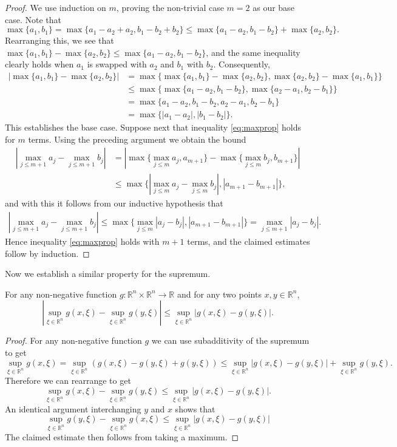 \documentclass[oneside,hidelinks,indentfirst,10pt]{book}
\begin{document}
\begin{proof}
We use induction on \(m\), proving the non-trivial case \(m=2\) as our base case. Note that
\[
    \max\{a_1,b_1\}=\max\{a_1-a_2+a_2,b_1-b_2+b_2\}\leq \max\{a_1-a_2,b_1-b_2\}+\max\{a_2,b_2\}.
\]
Rearranging this, we see that \(\max\{a_1,b_1\}-\max\{a_2,b_2\}\leq \max\{a_1-a_2,b_1-b_2\}\), and the same inequality clearly holds when \(a_1\) is swapped with \(a_2\) and \(b_1\) with \(b_2\). Consequently,
\begin{align*}
    |\max\{a_1,b_1\}-\max\{a_2,b_2\}|&=\max\{\max\{a_1,b_1\}-\max\{a_2,b_2\},\max\{a_2,b_2\}-\max\{a_1,b_1\}\}\\
    &\leq \max\{\max\{a_1-a_2,b_1-b_2\},\max\{a_2-a_1,b_2-b_1\}\}\\
    &=\max\{a_1-a_2,b_1-b_2,a_2-a_1,b_2-b_1\}\\
    &=\max\{|a_1-a_2|,|b_1-b_2|\}.
\end{align*}
This establishes the base case. Suppose next that inequality \eqref{eq:maxprop} holds for \(m\) terms. Using the preceding argument we obtain the bound
\begin{align*}
    |\max_{j\leq m+1}a_j-\max_{j\leq m+1}b_j|&=|\max\{\max_{j\leq m}a_j,a_{m+1}\}-\max\{\max_{j\leq m}b_j,b_{m+1}\}|\\
    &\leq \max\{|\max_{j\leq m}a_j-\max_{j\leq m}b_j|,|a_{m+1}-b_{m+1}|\},
\end{align*}
and with this it follows from our inductive hypothesis that
\begin{align*}
    |\max_{j\leq m+1}a_j-\max_{j\leq m+1}b_j|\leq \max\{ \max_{j\leq m}|a_j-b_j|,|a_{m+1}-b_{m+1}|\}= \max_{j\leq m+1}|a_j-b_j|  .  
\end{align*}
Hence inequality \eqref{eq:maxprop} holds with \(m+1\) terms, and the claimed estimates follow by induction.
\end{proof}


Now we establish a similar property for the supremum.


\begin{lem}\label{lem:supprop}
For any non-negative function \(g:\mathbb{R}^n\times\mathbb{R}^n\rightarrow\mathbb{R}\) and for any two points \(x,y\in\mathbb{R}^n\),
\[
    |\sup_{\xi\in\mathbb{R}^n} g(x,\xi)-\sup_{\xi\in\mathbb{R}^n} g(y,\xi)|\leq \sup_{\xi\in\mathbb{R}^n} |g(x,\xi)-g(y,\xi)|.
\]
\end{lem}

\begin{proof}
For any non-negative function \(g\) we can use subadditivity of the supremum to get
\[
    \sup_{\xi\in\mathbb{R}^n} g(x,\xi)=\sup_{\xi\in\mathbb{R}^n} (g(x,\xi)-g(y,\xi)+g(y,\xi))\leq \sup_{\xi\in\mathbb{R}^n} |g(x,\xi)-g(y,\xi)|+\sup_{\xi\in\mathbb{R}^n} g(y,\xi).
\]
Therefore we can rearrange to get
\[
    \sup_{\xi\in\mathbb{R}^n} g(x,\xi)-\sup_{\xi\in\mathbb{R}^n} g(y,\xi)\leq \sup_{\xi\in\mathbb{R}^n} |g(x,\xi)-g(y,\xi)|.
\]  
An identical argument interchanging \(y\) and \(x\) shows that 
\[
    \sup_{\xi\in\mathbb{R}^n} g(y,\xi)-\sup_{\xi\in\mathbb{R}^n} g(x,\xi)\leq \sup_{\xi\in\mathbb{R}^n} |g(x,\xi)-g(y,\xi)|
\]
The claimed estimate then follows from taking a maximum.
\end{proof}
\end{document}
